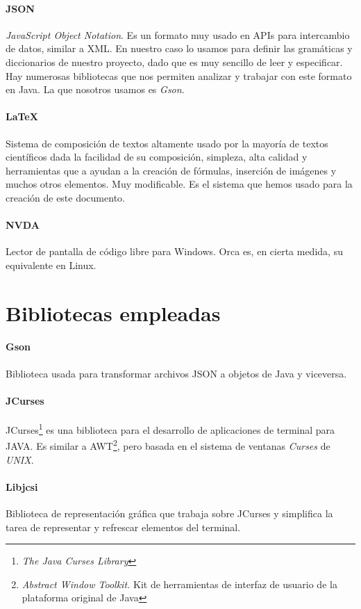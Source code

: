 \paragraph{JSON} \textit{JavaScript Object Notation}. Es un formato muy usado en APIs para intercambio de datos, similar a XML. En nuestro caso lo usamos para definir las gramáticas y diccionarios de nuestro proyecto, dado que es muy sencillo de leer y especificar. Hay numerosas bibliotecas que nos permiten analizar y trabajar con este formato en Java. La que nosotros usamos es \textit{Gson}.

\paragraph{\LaTeX} Sistema de composición de textos altamente usado por la mayoría de textos científicos dada la facilidad de su composición, simpleza, alta calidad y herramientas que a ayudan a la creación de fórmulas, inserción de imágenes y muchos otros elementos. Muy modificable. Es el sistema que hemos usado para la creación de este documento.

\paragraph{NVDA} Lector de pantalla de código libre para Windows. Orca es, en cierta medida, su equivalente en Linux.

\section{Bibliotecas empleadas}

\paragraph{Gson} Biblioteca usada para transformar archivos JSON a objetos de Java y viceversa.

\paragraph{JCurses} JCurses\footnote{\textit{The Java Curses Library}} es una biblioteca para el desarrollo de aplicaciones de terminal para JAVA. Es similar a AWT\footnote{\textit{Abstract Window Toolkit.} Kit de herramientas de interfaz de usuario de la plataforma original de Java}, pero basada en el sistema de ventanas \textit{Curses} de \textit{UNIX}.

\paragraph{Libjcsi} Biblioteca de representación gráfica que trabaja sobre JCurses y simplifica la tarea de representar y refrescar elementos del terminal.
